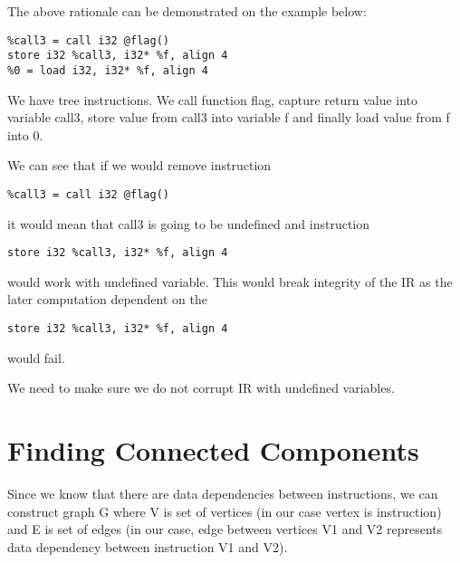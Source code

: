 \documentclass[12pt, twoside]{fithesis2}
\renewcommand{\_}{\leavevmode \kern0.07em\vbox{\hrule width0.4em}}
\begin{document}
The above rationale can be demonstrated on the example below:

\begin{verbatim}
%call3 = call i32 @flag()
store i32 %call3, i32* %f, align 4
%0 = load i32, i32* %f, align 4
\end{verbatim}

We have tree instructions. We call function flag, capture return value into
variable call3, store value from call3 into variable f and finally load value
from f into 0.

We can see that if we would remove instruction

\begin{verbatim}
%call3 = call i32 @flag()
\end{verbatim}

it would mean that call3 is going to be undefined and instruction

\begin{verbatim}
store i32 %call3, i32* %f, align 4
\end{verbatim}

would work with undefined variable. This would break integrity of the IR as the
later computation dependent on the

\begin{verbatim}
store i32 %call3, i32* %f, align 4
\end{verbatim}

would fail.

We need to make sure we do not corrupt IR with undefined variables.


\section{Finding Connected Components}
\label{sec:design-components}


Since we know that there are data dependencies between instructions, we can
construct graph G where V is set of vertices (in our case vertex is
instruction) and E is set of edges (in our case, edge between vertices V1 and
V2 represents data dependency between instruction V1 and V2).
\end{document}
